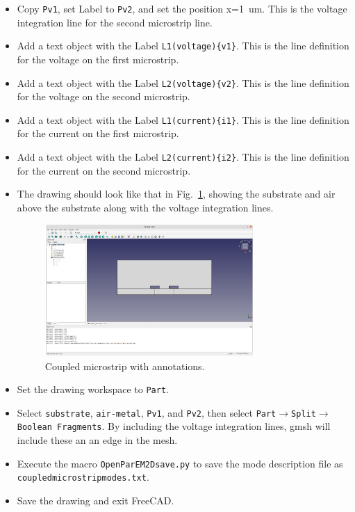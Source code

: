 \documentclass[titlepage]{article}
\renewcommand\_{\textunderscore\linebreak[1]}
\begin{document}
\begin{itemize}
\item Copy \texttt{\_Pv1}, set Label to \texttt{\_Pv2}, and set the position x=1~um.  This is the voltage integration line for the second microstrip line.
\item Add a text object with the Label \texttt{\_L1(voltage)\{v1\}}.  This is the line definition for the voltage on the first microstrip.
\item Add a text object with the Label \texttt{\_L2(voltage)\{v2\}}.  This is the line definition for the voltage on the second microstrip.
\item Add a text object with the Label \texttt{\_L1(current)\{i1\}}.  This is the line definition for the current on the first microstrip.
\item Add a text object with the Label \texttt{\_L2(current)\{i2\}}.  This is the line definition for the current on the second microstrip.
\item The drawing should look like that in Fig.~\ref{fig:coupled_drawing}, showing the substrate and air above the substrate along with the voltage integration lines.
\begin{figure}[H]
  \centering
  \includegraphics[width=0.75\textwidth]{../tutorials/OpenParEM2D/coupled_microstrip/screenshots/coupled_drawing}
  \caption{Coupled microstrip with annotations.}
  \label{fig:coupled_drawing}
\end{figure}
\item Set the drawing workspace to \texttt{Part}.
\item Select \texttt{substrate}, \texttt{air-metal}, \texttt{\_Pv1}, and \texttt{\_Pv2}, then select \texttt{Part}$\rightarrow$\texttt{Split}$\rightarrow$\texttt{Boolean Fragments}. By including the voltage integration lines, gmsh will include these an an edge in the mesh.
\item Execute the macro \texttt{OpenParEM2D\_save.py} to save the mode description file as \texttt{coupled\_microstrip\_modes.txt}.
\item Save the drawing and exit FreeCAD.
\end{itemize}
\end{document}
